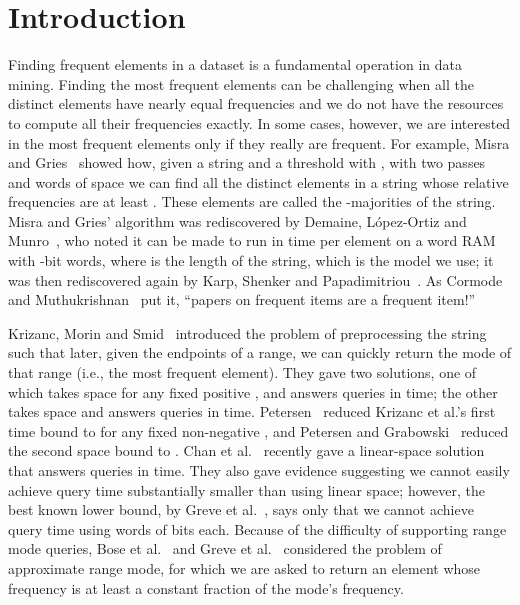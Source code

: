 \documentclass[prodmode,acmtalg]{acmsmall}
\begin{document}
\maketitle

\section{Introduction} \label{sec:intro}

Finding frequent elements in a dataset is a fundamental operation in data mining.  Finding the most frequent elements can be challenging when all the distinct elements have nearly equal frequencies and we do not have the resources to compute all their frequencies exactly.  In some cases, however, we are interested in the most frequent elements only if they really are frequent.  For example, Misra and Gries~\cite{MG82} showed how, given a string and a threshold  with , with two passes and  words of space we can find all the distinct elements in a string whose relative frequencies are at least .  These elements are called the -majorities of the string.  Misra and Gries' algorithm was rediscovered by Demaine, L\'opez-Ortiz and Munro~\cite{DLM02}, who noted it can be made to run in  time per element on a word RAM with -bit words, where  is the length of the string, which is the model we use; it was then rediscovered again by Karp, 
Shenker and Papadimitriou~\cite{KSP03}.  As Cormode and Muthukrishnan~\cite{CM03} put it, ``papers on frequent items are a frequent item!''

Krizanc, Morin and Smid~\cite{KMS05} introduced the problem of preprocessing the string such that later, given the endpoints of a range, we can quickly return the mode of that range (i.e., the most frequent element).  They gave two solutions, one of which takes  space for any fixed positive , and answers queries in  time; the other takes  space and answers queries in  time.  Petersen~\cite{Pet08} reduced Krizanc et al.'s first time bound to  for any fixed non-negative , and Petersen and Grabowski~\cite{PG09} reduced the second space bound to .  Chan et al.~\cite{CDLMW12} recently gave a linear-space solution that answers queries in  time.  They also gave evidence suggesting we cannot easily achieve query time substantially smaller than  using linear space; however, the best known lower bound, 
by Greve et al.~\cite{GJLT10}, says only that we cannot achieve query time  using  words of  bits each.  Because of the difficulty of supporting range mode queries, Bose et al.~\cite{BKMT05} and Greve et al.~\cite{GJLT10} considered the problem of approximate range mode, for which we are asked to return an element whose frequency is at least a constant fraction of the mode's frequency.
\end{document}
